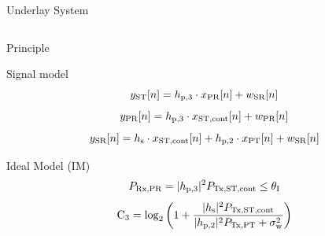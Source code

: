 \documentclass[16pt]{beamer}
\begin{document}
\begin{frame}[t]{Underlay System}
\begin{columns}
\begin{column}{0.44\columnwidth}
\begin{block}{\scriptsize Principle}
\begin{itemize}
				\end{itemize}
			\end{block}
			\vspace{2mm}
			{
				\begin{block}{\scriptsize Signal model} %
				\begin{equation*}
					y_{\text{ST}}[n] = h_{\text{p,3}} \cdot x_{\text{PR}}[n] + w_{\text{SR}}[n]
				\end{equation*}
				\begin{equation*}
					y_{\text{PR}}[n] = h_{\text{p,3}}  \cdot x_{\text{ST,cont}}[n] + w_{\text{PR}}[n]
				\end{equation*}
				\begin{equation*}
					y_{\text{SR}}[n] = h_{\text{s}} \cdot x_{\text{ST,cont}}[n] + h_{\text{p,2}} \cdot x_{\text{PT}}[n] + w_{\text{SR}}[n]
				\end{equation*}
				\end{block}
				\vspace{2mm}
				\begin{block}{\scriptsize Ideal Model (IM)} 
				\begin{equation*}
					P_{\text{Rx,PR}} = {{|h_{\text{p,3}}|^2}} P_{\text{Tx,ST,cont}} \le \theta_{\text{I}}
				\end{equation*}	
				\begin{equation*}
					\text{C}_{\text{3}} = \log_2 \left(1 + \frac{{{|h_{\text{s}}|^2}} P_{\text{Tx,ST,cont}}}{ {{|h_{\text{p,2}}|^2}} P_{\text{Tx,PT}} + \sigma^2_{\text{w}}} \right)	
				\end{equation*}	
				\end{block}	
			}
			{

}
\end{column}
\end{columns}
\end{frame}
\end{document}
